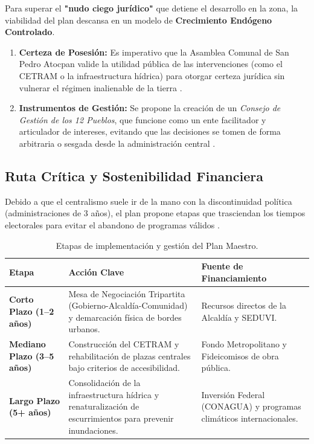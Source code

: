 Para superar el \textbf{"nudo ciego jurídico"} que detiene el desarrollo en la zona, 
la viabilidad del plan descansa en un modelo de 
\textbf{Crecimiento Endógeno Controlado}.

\begin{enumerate}
    \item \textbf{Certeza de Posesión:} Es imperativo que la Asamblea Comunal de 
            San Pedro Atocpan valide la utilidad pública de las 
            intervenciones (como el CETRAM o la infraestructura hídrica) 
            para otorgar certeza jurídica sin vulnerar el régimen 
            inalienable de la tierra \cite{milpaalta2017pddu}.
    \item \textbf{Instrumentos de Gestión:} Se propone la creación de 
            un \textit{Consejo de Gestión de los 12 Pueblos}, que funcione 
            como un ente facilitador y articulador de intereses, evitando 
            que las decisiones se tomen de forma arbitraria o sesgada 
            desde la administración central \cite{balandrano2016conservacion}.
\end{enumerate}

\subsection{Ruta Crítica y Sostenibilidad Financiera}
\label{ssec:ruta-critica}

Debido a que el centralismo suele ir de la mano con la discontinuidad 
política (administraciones de 3 años), el plan propone etapas que 
trasciendan los tiempos electorales para evitar el abandono de 
programas válidos \cite{balandrano2016conservacion}.

\begin{table}[H]
    \centering
    \caption{Etapas de implementación y gestión del Plan Maestro.}
    \label{tab:gestion_etapas}
    \small
    \begin{tabular}{|p{3cm}|p{5cm}|p{4cm}|}
        \hline
        \textbf{Etapa} & \textbf{Acción Clave} & \textbf{Fuente de Financiamiento} \\ \hline
        \textbf{Corto Plazo (1--2 años)}   & Mesa de Negociación Tripartita (Gobierno-Alcaldía-Comunidad)
                                              y demarcación física de bordes urbanos. 
                                            & Recursos directos de la Alcaldía y SEDUVI. \\ \hline
        \textbf{Mediano Plazo (3--5 años)} & Construcción del CETRAM y rehabilitación de plazas centrales
                                              bajo criterios de accesibilidad. 
                                            & Fondo Metropolitano y Fideicomisos de obra pública. \\ \hline
        \textbf{Largo Plazo (5+ años)}     & Consolidación de la infraestructura hídrica y
                                              renaturalización de escurrimientos para prevenir
                                              inundaciones. 
                                            & Inversión Federal (CONAGUA) y programas climáticos
                                              internacionales. \\ \hline
    \end{tabular}
\end{table}
